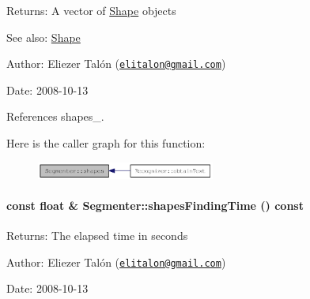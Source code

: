 \begin{Desc}
\item[Returns:]A vector of \hyperlink{class_shape}{Shape} objects\end{Desc}
\begin{Desc}
\item[See also:]\hyperlink{class_shape}{Shape}\end{Desc}
\begin{Desc}
\item[Author:]Eliezer Talón (\href{mailto:elitalon@gmail.com}{\tt elitalon@gmail.com}) \end{Desc}
\begin{Desc}
\item[Date:]2008-10-13 \end{Desc}


References shapes\_\-.

Here is the caller graph for this function:\nopagebreak
\begin{figure}[H]
\begin{center}
\leavevmode
\includegraphics[width=166pt]{class_segmenter_7ddded12f26e94e6f5cba2752d2c4142_icgraph}
\end{center}
\end{figure}
\hypertarget{class_segmenter_8d7304b35b1891b1c7154a3ac2ff2c4b}{
\paragraph[{shapesFindingTime}]{\setlength{\rightskip}{0pt plus 5cm}const float \& Segmenter::shapesFindingTime () const}\hfill}
\label{class_segmenter_8d7304b35b1891b1c7154a3ac2ff2c4b}


\begin{Desc}
\item[Returns:]The elapsed time in seconds\end{Desc}
\begin{Desc}
\item[Author:]Eliezer Talón (\href{mailto:elitalon@gmail.com}{\tt elitalon@gmail.com}) \end{Desc}
\begin{Desc}
\item[Date:]2008-10-13 \end{Desc}


